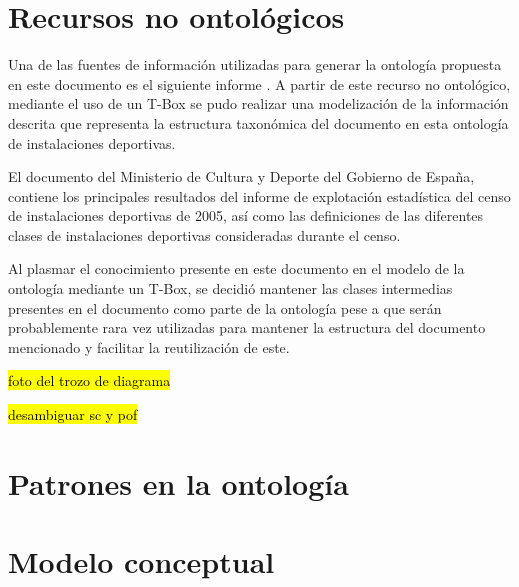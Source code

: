 \documentclass[a4paper,12pt]{article}
\begin{document}
	\section{Recursos no ontológicos}
	
	Una de las fuentes de información utilizadas para generar la ontología propuesta en este documento es el siguiente informe \cite{pdf-culturaydeporte}. A partir de este recurso no ontológico, mediante el uso de un T-Box se pudo realizar una modelización de la información descrita que representa la estructura taxonómica del documento en esta ontología de instalaciones deportivas. 
	
	El documento \cite{pdf-culturaydeporte} del Ministerio de Cultura y Deporte del Gobierno de España, contiene los  principales resultados del informe de explotación estadística del censo de instalaciones deportivas de 2005, así como las definiciones de las diferentes clases de instalaciones deportivas consideradas durante el censo.
	
	Al plasmar el conocimiento presente en este documento en el modelo de la ontología mediante un T-Box, se decidió mantener las clases intermedias presentes en el documento como parte de la ontología pese a que serán probablemente rara vez utilizadas para mantener la estructura del documento mencionado y facilitar la reutilización de este. 
	
	\hl{foto del trozo de diagrama}
	
	\hl{desambiguar sc y pof}
	
	\section{Patrones en la ontología}
	
	\section{Modelo conceptual}
	
\end{document}
